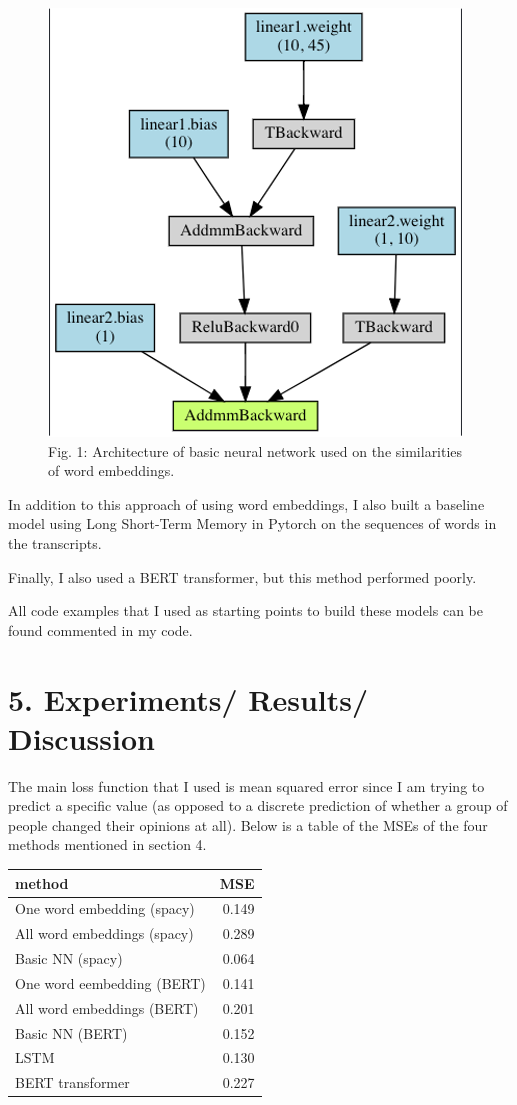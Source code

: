 \documentclass[12pt,]{article}
\begin{document}
\begin{figure}

{\centering \includegraphics[width=0.5\linewidth]{figures/basic_nn} 

}

\caption{Fig. 1: Architecture of basic neural network used on the similarities of word embeddings.}\label{fig:unnamed-chunk-1}
\end{figure}

In addition to this approach of using word embeddings, I also built a
baseline model using Long Short-Term Memory in Pytorch on the sequences
of words in the transcripts.

Finally, I also used a BERT transformer, but this method performed
poorly.

All code examples that I used as starting points to build these models
can be found commented in my code.

\hypertarget{experiments-results-discussion}{%
\section{5. Experiments/ Results/
Discussion}\label{experiments-results-discussion}}

The main loss function that I used is mean squared error since I am
trying to predict a specific value (as opposed to a discrete prediction
of whether a group of people changed their opinions at all). Below is a
table of the MSEs of the four methods mentioned in section 4.

\begin{longtable}[]{@{}lr@{}}
\toprule
method & MSE\tabularnewline
\midrule
\endhead
One word embedding (spacy) & 0.149\tabularnewline
All word embeddings (spacy) & 0.289\tabularnewline
Basic NN (spacy) & 0.064\tabularnewline
One word eembedding (BERT) & 0.141\tabularnewline
All word embeddings (BERT) & 0.201\tabularnewline
Basic NN (BERT) & 0.152\tabularnewline
LSTM & 0.130\tabularnewline
BERT transformer & 0.227\tabularnewline
\bottomrule
\end{longtable}
\end{document}
